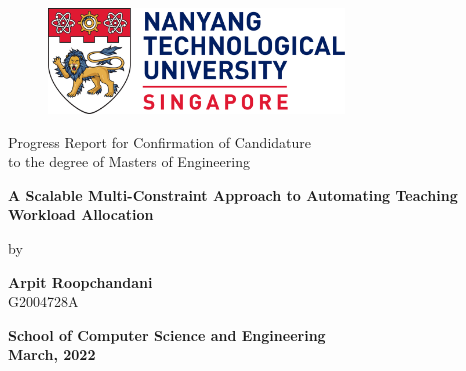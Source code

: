 

\begin{titlepage}
   \begin{center}
   \begin{doublespacing}

       \begin{figure}
       \centering
       \includegraphics[width=0.7\textwidth]{images/Nanyang_Technological_University.png}
       \end{figure}
       
       
       \vspace{5mm}
       {\large{Progress Report for Confirmation of Candidature}\\
       {to the degree of Masters of Engineering}}

       \vspace{30mm}
       
       {\Large\textbf{A Scalable Multi-Constraint Approach to Automating Teaching Workload Allocation}}
       

    
            
       \vspace{20mm}
       
       by
       
       \vspace{20mm}

       {\Large\textbf{Arpit Roopchandani}\\
       {G2004728A}}

       \vfill
       {\large \textbf{School of Computer Science and Engineering}\\
       \textbf{March, 2022}}
       
    \end{doublespacing}

   \end{center}
\end{titlepage}
